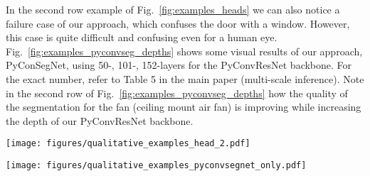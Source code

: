 \documentclass{article}
\begin{document}
In the second row example of Fig.~\ref{fig:examples_heads} we can also notice a failure case of our approach, which confuses the door with a  window. However, this case is quite difficult and confusing even for a human eye. Fig.~\ref{fig:examples_pyconvseg_depths} shows some visual results of our approach, PyConSegNet, using 50-, 101-, 152-layers for the PyConvResNet backbone. For the exact number, refer to Table 5 in the main paper (multi-scale inference). Note in the second row of Fig.~\ref{fig:examples_pyconvseg_depths} how the quality of the segmentation for the fan (ceiling mount air fan) is improving while increasing the depth of our PyConvResNet backbone.



\begin{figure*}[t]
  \centering
  \texttt{[image: figures/qualitative\_examples\_head\_2.pdf]}
  \caption{Visual comparison results of our approach PyConSegNet (with PyConvPH head) with state-of-the-art approaches: PSPNet~\cite{zhao2017pyramid} (with PPM head) and  DeepLabv3~\cite{chen2017rethinking} (with ASPP head). The images are from ADE20K dataset~\cite{zhou2019semantic} validation.}
  \label{fig:examples_heads}
\end{figure*}

\begin{figure*}[t]
  \centering
  \texttt{[image: figures/qualitative\_examples\_pyconvsegnet\_only.pdf]}
  \caption{Visual results of our approach, PyConSegNet, on 50-, 101-, 152-layers deep backbone PyConvResNet. The images are from ADE20K dataset~\cite{zhou2019semantic} validation set.  }
  \label{fig:examples_pyconvseg_depths}
\end{figure*}

\clearpage


\printbibliography
\end{document}
